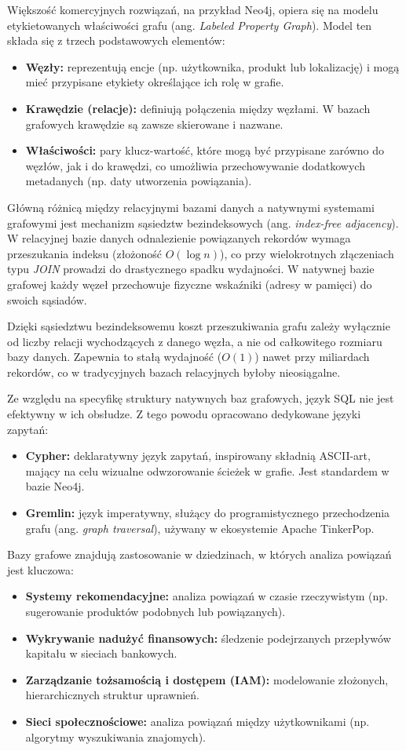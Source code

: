 Większość komercyjnych rozwiązań, na przykład Neo4j, opiera się na modelu etykietowanych właściwości grafu (ang. \emph{Labeled Property Graph}). Model ten składa się z trzech podstawowych elementów:
\begin{itemize}
    \item \textbf{Węzły:} reprezentują encje (np. użytkownika, produkt lub lokalizację) i mogą mieć przypisane etykiety określające ich rolę w grafie.
    \item \textbf{Krawędzie (relacje):} definiują połączenia między węzłami. W bazach grafowych krawędzie są zawsze skierowane i nazwane.
    \item \textbf{Właściwości:} pary klucz-wartość, które mogą być przypisane zarówno do węzłów, jak i do krawędzi, co umożliwia przechowywanie dodatkowych metadanych (np. daty utworzenia powiązania).
\end{itemize}
Główną różnicą między relacyjnymi bazami danych a natywnymi systemami grafowymi jest mechanizm sąsiedztw bezindeksowych (ang. \emph{index-free adjacency}). W relacyjnej bazie danych odnalezienie powiązanych rekordów wymaga przeszukania indeksu (złożoność $O(\log n)$), co przy wielokrotnych złączeniach typu \emph{JOIN} prowadzi do drastycznego spadku wydajności. W natywnej bazie grafowej każdy węzeł przechowuje fizyczne wskaźniki (adresy w pamięci) do swoich sąsiadów.

Dzięki sąsiedztwu bezindeksowemu koszt przeszukiwania grafu zależy wyłącznie od liczby relacji wychodzących z danego węzła, a nie od całkowitego rozmiaru bazy danych. Zapewnia to stałą wydajność ($O(1)$) nawet przy miliardach rekordów, co w tradycyjnych bazach relacyjnych byłoby nieosiągalne.

Ze względu na specyfikę struktury natywnych baz grafowych, język SQL nie jest efektywny w ich obsłudze. Z tego powodu opracowano dedykowane języki zapytań:
\begin{itemize}
    \item \textbf{Cypher:} deklaratywny język zapytań, inspirowany składnią ASCII-art, mający na celu wizualne odwzorowanie ścieżek w grafie. Jest standardem w bazie Neo4j.
    \item \textbf{Gremlin:} język imperatywny, służący do programistycznego przechodzenia grafu (ang. \emph{graph traversal}), używany w ekosystemie Apache TinkerPop.
\end{itemize}
Bazy grafowe znajdują zastosowanie w dziedzinach, w których analiza powiązań jest kluczowa:
\begin{itemize}
    \item \textbf{Systemy rekomendacyjne:} analiza powiązań w czasie rzeczywistym (np. sugerowanie produktów podobnych lub powiązanych).
    \item \textbf{Wykrywanie nadużyć finansowych:} śledzenie podejrzanych przepływów kapitału w sieciach bankowych.
    \item \textbf{Zarządzanie tożsamością i dostępem (IAM):} modelowanie złożonych, hierarchicznych struktur uprawnień.
    \item \textbf{Sieci społecznościowe:} analiza powiązań między użytkownikami (np. algorytmy wyszukiwania znajomych).
\end{itemize}
